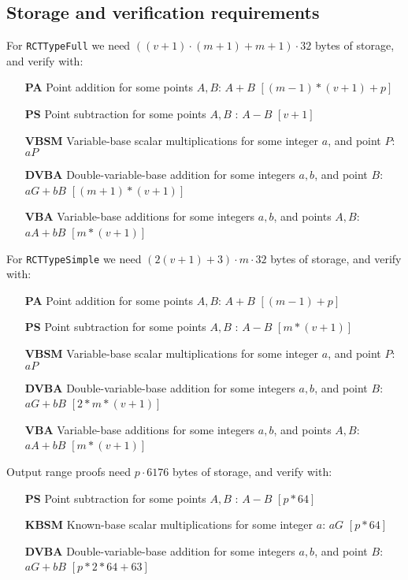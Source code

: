 \newpage
\subsection{Storage and verification requirements}

For {\tt RCTTypeFull} we need $((v + 1) \cdot (m + 1) + m + 1) \cdot 32$ bytes of storage, and verify with:
\begin{itemize}
    \setlength\itemsep{\listspace}
    \item [\textbf{PA}] Point addition for some points $A, B$: $A + B$ \quad \([(m-1)*(v+1) + p]\)%
    \item [\textbf{PS}] Point subtraction for some points $A, B$ : $A - B$ \quad \([v+1]\)%
    \item [\textbf{VBSM}] Variable-base scalar multiplications for some integer $a$, and point $P$: $a P$ \quad [$m$ + 1]%
    \item [\textbf{DVBA}] Double-variable-base addition for some integers $a, b$, and point $B$: $a G + b B$ \quad \([(m+1)*(v+1)]\)%
    \item [\textbf{VBA}] Variable-base additions for some integers $a, b$, and points $A, B$: $a A + b B$ \quad \([m*(v+1)]\)%
\end{itemize}

For {\tt RCTTypeSimple} we need $(2(v+1)+3) \cdot m \cdot 32$ bytes of storage, and verify with:
\begin{itemize}
    \setlength\itemsep{\listspace}
    \item [\textbf{PA}] Point addition for some points $A, B$: $A + B$ \quad \([(m-1) + p]\)%
    \item [\textbf{PS}] Point subtraction for some points $A, B$ : $A - B$ \quad \([m*(v+1)]\)
    \item [\textbf{VBSM}] Variable-base scalar multiplications for some integer $a$, and point $P$: $a P$ \quad [$m$ + 1]
    \item [\textbf{DVBA}] Double-variable-base addition for some integers $a, b$, and point $B$: $a G + b B$ \quad \([2*m*(v+1)]\)
    \item [\textbf{VBA}] Variable-base additions for some integers $a, b$, and points $A, B$: $a A + b B$ \quad \([m*(v+1)]\)
\end{itemize}

Output range proofs need $p \cdot 6176$ bytes of storage, and verify with:
\begin{itemize}
    \setlength\itemsep{\listspace}
    \item [\textbf{PS}] Point subtraction for some points $A, B$ : $A - B$ \quad \([p*64]\)
    \item [\textbf{KBSM}] Known-base scalar multiplications for some integer $a$: $a G$ \quad \([p*64]\)
    \item [\textbf{DVBA}] Double-variable-base addition for some integers $a, b$, and point $B$: $a G + b B$ \quad \([p*2*64 + 63]\)
\end{itemize}

